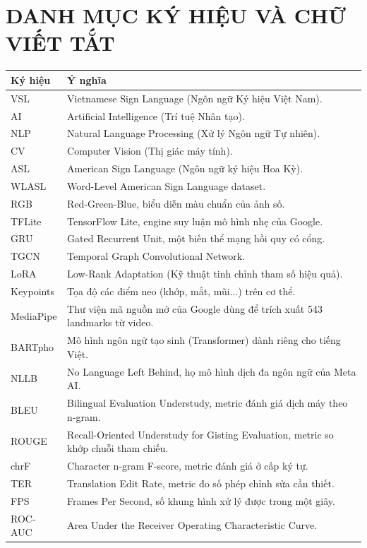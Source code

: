 ﻿\documentclass{article}
\numberwithin{equation}{section}
\numberwithin{figure}{section}
\numberwithin{table}{section}
\begin{document}
{}
\renewcommand{\listtablename}{DANH MỤC BẢNG BIỂU}
{\let\oldnumberline\numberline
\renewcommand{\numberline}{Bảng~\oldnumberline}
\listoftables}

\newpage

\section*{DANH MỤC KÝ HIỆU VÀ CHỮ VIẾT TẮT}

\begin{longtable}{p{3cm}p{11cm}}
\textbf{Ký hiệu} & \textbf{Ý nghĩa} \\ \hline
VSL & Vietnamese Sign Language (Ngôn ngữ Ký hiệu Việt Nam). \\ 
AI & Artificial Intelligence (Trí tuệ Nhân tạo). \\
NLP & Natural Language Processing (Xử lý Ngôn ngữ Tự nhiên). \\
CV & Computer Vision (Thị giác máy tính). \\
ASL & American Sign Language (Ngôn ngữ ký hiệu Hoa Kỳ). \\
WLASL & Word-Level American Sign Language dataset. \\
RGB & Red-Green-Blue, biểu diễn màu chuẩn của ảnh số. \\
TFLite & TensorFlow Lite, engine suy luận mô hình nhẹ của Google. \\
GRU & Gated Recurrent Unit, một biến thể mạng hồi quy có cổng. \\
TGCN & Temporal Graph Convolutional Network. \\
LoRA & Low-Rank Adaptation (Kỹ thuật tinh chỉnh tham số hiệu quả). \\
Keypoints & Tọa độ các điểm neo (khớp, mắt, mũi...) trên cơ thể. \\
MediaPipe & Thư viện mã nguồn mở của Google dùng để trích xuất 543 landmarks từ video. \\
BARTpho & Mô hình ngôn ngữ tạo sinh (Transformer) dành riêng cho tiếng Việt. \\
NLLB & No Language Left Behind, họ mô hình dịch đa ngôn ngữ của Meta AI. \\
BLEU & Bilingual Evaluation Understudy, metric đánh giá dịch máy theo n-gram. \\
ROUGE & Recall-Oriented Understudy for Gisting Evaluation, metric so khớp chuỗi tham chiếu. \\
chrF & Character n-gram F-score, metric đánh giá ở cấp ký tự. \\
TER & Translation Edit Rate, metric đo số phép chỉnh sửa cần thiết. \\
FPS & Frames Per Second, số khung hình xử lý được trong một giây. \\
ROC-AUC & Area Under the Receiver Operating Characteristic Curve. \\
\end{longtable}
\end{document}
